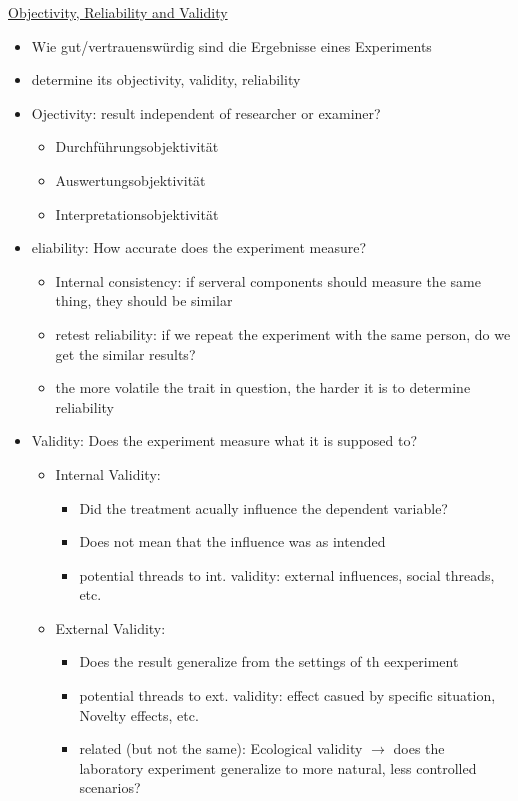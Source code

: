 \documentclass[a4paper,10pt,oneside]{article}
\begin{document}
\underline{Objectivity, Reliability and Validity} \\
	\begin{itemize}
		\item Wie gut/vertrauenswürdig sind die Ergebnisse eines Experiments
		\item determine its objectivity, validity, reliability
		\item Ojectivity: result independent of researcher or examiner?
			\begin{itemize}
				\item Durchführungsobjektivität
				\item Auswertungsobjektivität
				\item Interpretationsobjektivität
			\end{itemize}
		\item eliability: How accurate does the experiment measure?
			\begin{itemize}
				\item Internal consistency: if serveral components should measure the same thing, they should be similar
				\item retest reliability: if we repeat the experiment with the same person, do we get the similar results?
				\item the more volatile the trait in question, the harder it is to determine reliability
			\end{itemize}
		\item Validity: Does the experiment measure what it is supposed to?
			 \begin{itemize}
			 	\item Internal Validity:
			 		\begin{itemize}
			 			\item Did the treatment acually influence the dependent variable?
			 			\item Does not mean that the influence was as intended
			 			\item potential threads to int. validity: external influences, social threads, etc.
			 		\end{itemize}
			 	\item External Validity:
			 		\begin{itemize}
			 			\item Does the result generalize from the settings of th eexperiment
			 			\item potential threads to ext. validity: effect casued by specific situation, Novelty effects, etc.
			 			\item related (but not the same): Ecological validity $\rightarrow$ does the laboratory experiment generalize to more natural, less controlled scenarios?

\end{itemize}
\end{itemize}
\end{itemize}
\end{document}
